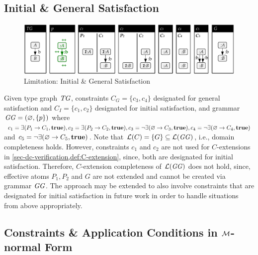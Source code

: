 \subsection{Initial \& General Satisfaction}
\begin{figure}[!tb]
\begin{center}
\includegraphics[width=\textwidth]{img/limitations/general.pdf}
\end{center}
\caption{Limitation: Initial \& General Satisfaction}
\label{fig:sec-dc-general-lim:igsat}
\end{figure}

Given type graph $\mathit{TG}$, constraints $C_G=\{c_3,c_4\}$ designated for general satisfaction and $C_I=\{c_1,c_2\}$ designated for initial satisfaction, and grammar $\mathit{GG}=(\varnothing,\{p\})$ where $c_1=\exists(P_1 \to C_1,\textbf{true}),c_2=\exists(P_2 \to C_2,\textbf{true}),c_3=\neg\exists(\varnothing \to C_3,\textbf{true}),c_4=\neg\exists(\varnothing \to C_4,\textbf{true})$ and $c_5=\neg\exists(\varnothing \to C_5,\textbf{true})$.
Note that $\mathcal{L}(C)=\{G\} \subseteq \mathcal{L}(\mathit{GG})$, i.e., domain completeness holds.
However, constraints $c_1$ and $c_2$ are not used for $C$-extensions in \cref{sec-dc-verification,def:C-extension}, since, both are designated for initial satisfaction.
Therefore, $C$-extension completeness of $\mathcal{L}(\mathit{GG})$ does not hold, since, effective atoms $P_1,P_2$ and $G$ are not extended and cannot be created via grammar $\mathit{GG}$.
The approach may be extended to also involve constraints that are designated for initial satisfaction in future work in order to handle situations from above appropriately.

\subsection{Constraints \& Application Conditions in ${\cal M}$-normal Form}


